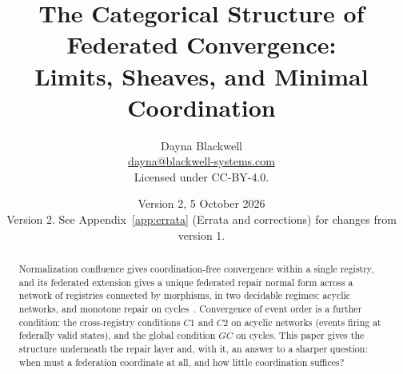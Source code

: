 \documentclass[11pt,a4paper]{article}
\title{The Categorical Structure of Federated Convergence:\\
Limits, Sheaves, and Minimal Coordination}
\author{
Dayna Blackwell\\
\small\href{mailto:dayna@blackwell-systems.com}{dayna@blackwell-systems.com}\\
\small Licensed under CC-BY-4.0.}
\date{Version 2, 5 October 2026\\[0.6ex]
\small Version 2. See Appendix~\ref{app:errata} (Errata and corrections) for changes from version 1.}
\theoremstyle{plain}
\theoremstyle{definition}
\theoremstyle{remark}
\renewcommand{\_}{\origunderscore\allowbreak}
\begin{document}
\maketitle

\begin{abstract}
\setlength{\parskip}{0.6\baselineskip plus 2pt minus 1pt}
Normalization confluence gives coordination-free convergence within a single registry, and its
federated extension gives a unique federated repair normal form across a network of registries
connected by morphisms, in two decidable regimes: acyclic networks, and monotone repair on
cycles~\cite{blackwell2026nc, blackwell2026federated}. Convergence of event order is a further
condition: the cross-registry conditions $C1$ and $C2$ on acyclic networks (events firing at
federally valid states), and the global condition $GC$ on cycles. This paper gives the structure
underneath the repair layer and, with it, an answer to a sharper question: when must a federation
coordinate at all, and how little coordination suffices?


\end{abstract}
\end{document}
